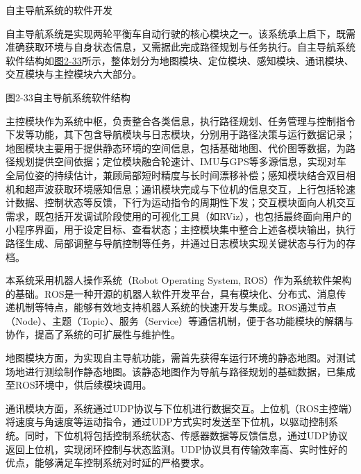 自主导航系统的软件开发

自主导航系统是实现两轮平衡车自动行驶的核心模块之一。该系统承上启下，既需准确获取环境与自身状态信息，又需据此完成路径规划与任务执行。自主导航系统软件结构如\hyperref[_Ref201344232]{图2-33}所示，整体划分为地图模块、定位模块、感知模块、通讯模块、交互模块与主控模块六大部分。



\protect{}\label{_Ref201344232}{}图2-33自主导航系统软件结构

主控模块作为系统中枢，负责整合各类信息，执行路径规划、任务管理与控制指令下发等功能，其下包含导航模块与日志模块，分别用于路径决策与运行数据记录；地图模块主要用于提供静态环境的空间信息，包括基础地图、代价图等数据，为路径规划提供空间依据；定位模块融合轮速计、IMU与GPS等多源信息，实现对车全局位姿的持续估计，兼顾局部短时精度与长时间漂移补偿；感知模块结合双目相机和超声波获取环境感知信息；通讯模块完成与下位机的信息交互，上行包括轮速计数据、控制状态等反馈，下行为运动指令的周期性下发；交互模块面向人机交互需求，既包括开发调试阶段使用的可视化工具（如RViz），也包括最终面向用户的小程序界面，用于设定目标、查看状态；主控模块集中整合上述各模块输出，执行路径生成、局部调整与导航控制等任务，并通过日志模块实现关键状态与行为的存档。

本系统采用机器人操作系统（Robot Operating System,
ROS）作为系统软件架构的基础。ROS是一种开源的机器人软件开发平台，具有模块化、分布式、消息传递机制等特点，能够有效地支持机器人系统的快速开发与集成。ROS通过节点（Node）、主题（Topic）、服务（Service）等通信机制，便于各功能模块的解耦与协作，提高了系统的可扩展性与维护性。

地图模块方面，为实现自主导航功能，需首先获得车运行环境的静态地图。对测试场地进行测绘制作静态地图。该静态地图作为导航与路径规划的基础数据，已集成至ROS环境中，供后续模块调用。

通讯模块方面，系统通过UDP协议与下位机进行数据交互。上位机（ROS主控端）将速度与角速度等运动指令，通过UDP方式实时发送至下位机，以驱动控制系统。同时，下位机将包括控制系统状态、传感器数据等反馈信息，通过UDP协议返回上位机，实现闭环控制与状态监测。UDP协议具有传输效率高、实时性好的优点，能够满足车控制系统对时延的严格要求。

